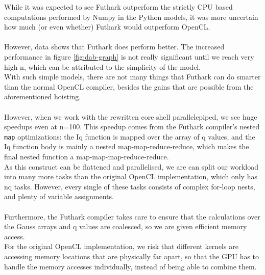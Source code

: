 \documentclass[11pt]{article}
\begin{document}
\begin{mdframed}[
    frametitle={Why does Futhark perform faster than OpenCL?},
    nobreak=true]

While it was expected to see Futhark outperform the strictly CPU based 
computations performed by Numpy in the Python models, it was more uncertain
how much (or even whether) Futhark would outperform OpenCL.
\\\\
However, data shows that Futhark does perform better. The increased performance 
in figure \ref{fig:dab-graph} is not really significant until we reach very high
n, which can be attributed to the simplicity of the model.
\\
With such simple models, there are not many things that Futhark can do smarter 
than the normal OpenCL compiler, besides the gains that are possible from
the aforementioned hoisting.
\\\\
However, when we work with the rewritten core shell parallelepiped, we see huge
speedups even at n=100. This speedup comes from the Futhark compiler's 
nested \texttt{map} optimizations: the Iq function is mapped
over the array of q values, and the Iq function body is mainly a nested 
map-map-reduce-reduce, which makes the final nested function a 
map-map-map-reduce-reduce. 
\\
As this construct can be flattened and parallelised\cite[sec. 5]{pldi17}, 
we are can split our workload into many more tasks than the original OpenCL 
implementation, which only has nq tasks. However, every single of these tasks
consists of complex for-loop nests, and plenty of variable assignments.
\\\\
Furthermore, the Futhark compiler takes care to ensure that the calculations 
over the Gauss arrays and q values are coalesced, so we are given 
efficient memory access.
\\
For the original OpenCL implementation, we risk that different kernels are
accessing memory locations that are physically far apart, so that the GPU
has to handle the memory accesses individually, instead of being able to 
combine them.
\end{mdframed}
\end{document}
